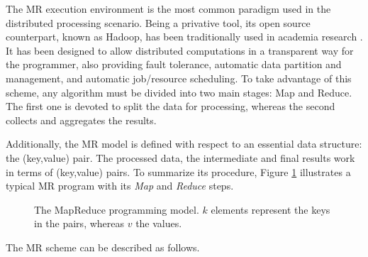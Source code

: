 \documentclass[3p,review]{elsarticle}
\begin{document}
	The MR execution environment \cite{Dea08} is the most common paradigm used in the distributed processing scenario. Being a privative tool, its open source counterpart, known as Hadoop, has been traditionally used in academia research \cite{Whi15-Hadoop}. It has been designed to allow distributed computations in a transparent way for the programmer, also providing fault tolerance, automatic data partition and management, and automatic job/resource scheduling. To take advantage of this scheme, any algorithm must be divided into two main stages: Map and Reduce. The first one is devoted to split the data for processing, whereas the second collects and aggregates the results.
	
	Additionally, the MR model is defined with respect to an essential data structure: the (key,value) pair. The processed data, the intermediate and final results work in terms of (key,value) pairs. To summarize its procedure, Figure \ref{fig:mapreduce} illustrates a typical MR program with its \textit{Map} and \textit{Reduce} steps. %
	
	\begin{figure}[!ht]
		\centering {} \caption{The MapReduce programming model. $k$ elements represent the keys in the pairs, whereas $v$ the values.}
		\label{fig:mapreduce}
	\end{figure}
	
	The MR scheme can be described as follows. 
	
\end{document}
